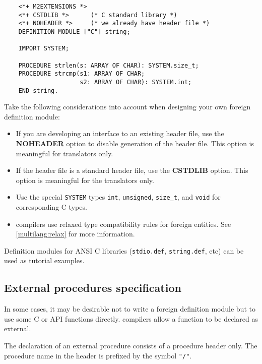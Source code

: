 \Example
\begin{verbatim}
    <*+ M2EXTENSIONS *>
    <*+ CSTDLIB *>      (* C standard library *)
    <*+ NOHEADER *>     (* we already have header file *)
    DEFINITION MODULE ["C"] string;

    IMPORT SYSTEM;

    PROCEDURE strlen(s: ARRAY OF CHAR): SYSTEM.size_t;
    PROCEDURE strcmp(s1: ARRAY OF CHAR;
                     s2: ARRAY OF CHAR): SYSTEM.int;
    END string.
\end{verbatim}

Take the following considerations into account when designing
your own foreign definition module:
\begin{itemize}
\item
        If you are developing an interface to an existing header file,
        use the {\bf NOHEADER} option to disable generation of the header
        file.  This option is meaningful for translators only.
\item
        If the header file is a standard header file, use the
        {\bf CSTDLIB} option. This option is meaningful for the translators
        only.
\item
        Use the special \verb'SYSTEM' types {\tt int}, {\tt unsigned},
        \verb|size_t|, and {\tt void} for corresponding
        C types.
\item
        \xds{} compilers use relaxed type compatibility rules
        for foreign entities. See \ref{multilang:relax} for
        more information.

\end{itemize}
\ifgenc
Definition modules for ANSI C libraries ({\tt stdio.def},
{\tt string.def}, etc) can be used as tutorial examples.
\fi

\subsection{External procedures specification}\label{multilang:extproc}

In some cases, it may be desirable not to write a foreign
definition module but to use some C or API functions directly.
\xds{} compilers allow a function to be declared as external.

The declaration of an external procedure consists of a procedure
header only. The procedure name in the header is prefixed by the
symbol \verb|"/"|.

